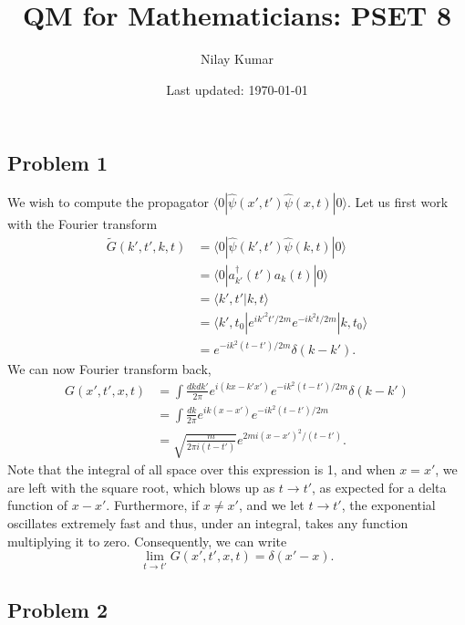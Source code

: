 \documentclass{../mathnotes}
\title{QM for Mathematicians: PSET 8}
\author{Nilay Kumar}
\date{Last updated: \today}
\begin{document}
\maketitle

\subsection*{Problem 1}

We wish to compute the propagator $\langle 0 | \hat\psi(x',t')\hat\psi(x,t)|0\rangle$. Let us first work with the
Fourier transform
\begin{align*}
    \tilde G(k',t',k,t)&=\langle 0 | \hat\psi(k',t')\hat\psi(k,t)|0\rangle\\
    &=\langle 0|a_{k'}^\dagger(t')a_k(t)|0\rangle\\
    &=\langle k',t'|k,t\rangle\\
    &=\langle k',t_0|e^{ik'^2t'/2m}e^{-ik^2t/2m}|k,t_0\rangle\\
    &=e^{-ik^2(t-t')/2m}\delta(k-k').
\end{align*}
We can now Fourier transform back,
\begin{align*}
    G(x',t',x,t)&=\int \frac{dk dk'}{2\pi}e^{i(kx-k'x')}e^{-ik^2(t-t')/2m}\delta(k-k')\\
    &=\int \frac{dk}{2\pi}e^{ik(x-x')}e^{-ik^2(t-t')/2m}\\
    &=\sqrt{\frac{m}{2\pi i(t-t')}}e^{2mi(x-x')^2/(t-t')}.
\end{align*}
Note that the integral of all space over this expression is 1, and when $x=x'$, we are left with the square root, which blows up as
$t\to t'$, as expected for a delta function of $x-x'$. Furthermore, if $x\neq x'$, and we let $t\to t'$, the exponential oscillates
extremely fast and thus, under an integral, takes any function multiplying it to zero. Consequently, we can write
\[\lim_{t\to t'}G(x',t',x,t)=\delta(x'-x).\]

\subsection*{Problem 2}
\end{document}

